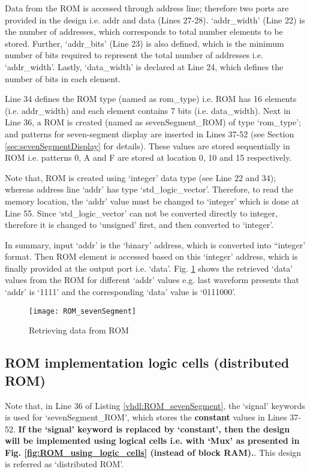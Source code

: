 \begin{explanation}
	Data from the ROM is accessed through address line; therefore two ports are provided in the design i.e. addr and data (Lines 27-28). `addr\_width' (Line 22) is the number of addresses, which corresponds to total number elements to be stored. Further, `addr\_bits' (Line 23) is also defined, which is the minimum number of bits required to represent the total number of addresses i.e. `addr\_width'. Lastly, `data\_width' is declared at Line 24, which defines the number of bits in each element.
	
	Line 34 defines the ROM type (named as rom\_type) i.e. ROM has 16 elements (i.e. addr\_width) and each element contains 7 bits (i.e. data\_width). Next in Line 36, a ROM is created (named as sevenSegment\_ROM) of type `rom\_type'; and patterns for seven-segment display are inserted in Lines 37-52 (see Section \ref{sec:sevenSegmentDisplay} for details). These values are stored sequentially in ROM i.e. patterns 0, A and F are stored at location 0, 10 and 15 respectively. 
	
	Note that, ROM is created using `integer' data type (see Line 22 and 34); whereas address line `addr' has type `std\_logic\_vector'. Therefore, to read the memory location, the `addr' value must be changed to `integer' which is done at Line 55. Since `std\_logic\_vector' can not be converted directly to integer, therefore it is changed to `unsigned' first, and then converted to `integer'. 
	
	In summary, input `addr' is the `binary' address, which is converted into ``integer' format. Then ROM element is accessed based on this `integer' address, which is finally provided at the output port i.e. `data'. Fig. \ref{fig:ROM_sevenSegment} shows the retrieved `data' values from the ROM for different `addr' values e.g. last waveform presents that `addr' is `1111' and the corresponding `data' value is `0111000'. 
	
	\begin{figure}[!h]
		\centering
		\texttt{[image: ROM\_sevenSegment]}
		\caption{Retrieving data from ROM}
		\label{fig:ROM_sevenSegment}
	\end{figure}
\end{explanation}




\subsection{ROM implementation logic cells (distributed ROM)}
Note that, in Line 36 of Listing \ref{vhdl:ROM_sevenSegment}, the `signal' keywords is used for `sevenSegment\_ROM', which stores the \textbf{constant} values in Lines 37-52. \textbf{If the `signal' keyword is replaced by `constant', then the design will be implemented using logical cells i.e. with `Mux' as presented in Fig. \ref{fig:ROM_using_logic_cells} (instead of block RAM).}. This design is referred as `distributed ROM'. 

